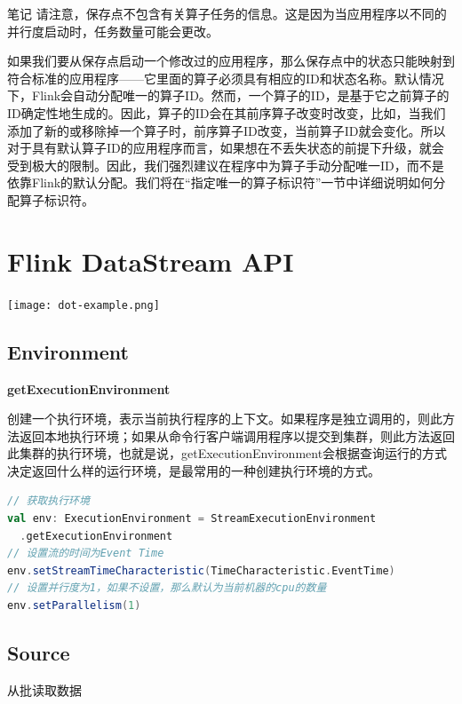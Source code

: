 \documentclass[oneside]{ctexbook}
\begin{document}
\begin{bclogo}[logo=\bcinfo, couleurBarre=orange, noborder=true, couleur=white]{笔记}
请注意，保存点不包含有关算子任务的信息。这是因为当应用程序以不同的并行度启动时，任务数量可能会更改。
\end{bclogo}

如果我们要从保存点启动一个修改过的应用程序，那么保存点中的状态只能映射到符合标准的应用程序——它里面的算子必须具有相应的ID和状态名称。默认情况下，Flink会自动分配唯一的算子ID。然而，一个算子的ID，是基于它之前算子的ID确定性地生成的。因此，算子的ID会在其前序算子改变时改变，比如，当我们添加了新的或移除掉一个算子时，前序算子ID改变，当前算子ID就会变化。所以对于具有默认算子ID的应用程序而言，如果想在不丢失状态的前提下升级，就会受到极大的限制。因此，我们强烈建议在程序中为算子手动分配唯一ID，而不是依靠Flink的默认分配。我们将在“指定唯一的算子标识符”一节中详细说明如何分配算子标识符。

\chapter{Flink DataStream API}

\noindent \texttt{[image: dot-example.png]}

\section{Environment}

\textbf{getExecutionEnvironment}

创建一个执行环境，表示当前执行程序的上下文。如果程序是独立调用的，则此方法返回本地执行环境；如果从命令行客户端调用程序以提交到集群，则此方法返回此集群的执行环境，也就是说，getExecutionEnvironment会根据查询运行的方式决定返回什么样的运行环境，是最常用的一种创建执行环境的方式。

\begin{lstlisting}[language=scala, breaklines]
// 获取执行环境
val env: ExecutionEnvironment = StreamExecutionEnvironment
  .getExecutionEnvironment
// 设置流的时间为Event Time
env.setStreamTimeCharacteristic(TimeCharacteristic.EventTime)
// 设置并行度为1，如果不设置，那么默认为当前机器的cpu的数量
env.setParallelism(1)
\end{lstlisting}

\section{Source}

从批读取数据
\end{document}
